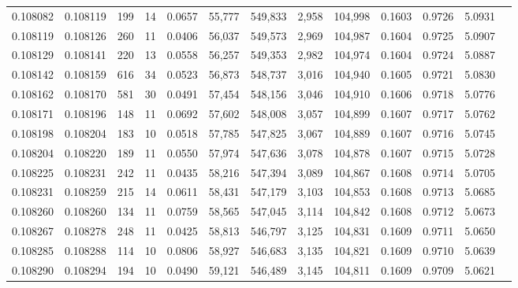 \begin{tabular}{rrrrrrrrrrrrr}
0.108082 & 0.108119 &   199 &  14 &                                     0.0657 &  55,777 & 549,833 &   2,958 & 104,998 & 0.1603 & 0.9726 & 5.0931 \\
0.108119 & 0.108126 &   260 &  11 &                                     0.0406 &  56,037 & 549,573 &   2,969 & 104,987 & 0.1604 & 0.9725 & 5.0907 \\
0.108129 & 0.108141 &   220 &  13 &                                     0.0558 &  56,257 & 549,353 &   2,982 & 104,974 & 0.1604 & 0.9724 & 5.0887 \\
0.108142 & 0.108159 &   616 &  34 &                                     0.0523 &  56,873 & 548,737 &   3,016 & 104,940 & 0.1605 & 0.9721 & 5.0830 \\
0.108162 & 0.108170 &   581 &  30 &                                     0.0491 &  57,454 & 548,156 &   3,046 & 104,910 & 0.1606 & 0.9718 & 5.0776 \\
0.108171 & 0.108196 &   148 &  11 &                                     0.0692 &  57,602 & 548,008 &   3,057 & 104,899 & 0.1607 & 0.9717 & 5.0762 \\
0.108198 & 0.108204 &   183 &  10 &                                     0.0518 &  57,785 & 547,825 &   3,067 & 104,889 & 0.1607 & 0.9716 & 5.0745 \\
0.108204 & 0.108220 &   189 &  11 &                                     0.0550 &  57,974 & 547,636 &   3,078 & 104,878 & 0.1607 & 0.9715 & 5.0728 \\
0.108225 & 0.108231 &   242 &  11 &                                     0.0435 &  58,216 & 547,394 &   3,089 & 104,867 & 0.1608 & 0.9714 & 5.0705 \\
0.108231 & 0.108259 &   215 &  14 &                                     0.0611 &  58,431 & 547,179 &   3,103 & 104,853 & 0.1608 & 0.9713 & 5.0685 \\
0.108260 & 0.108260 &   134 &  11 &                                     0.0759 &  58,565 & 547,045 &   3,114 & 104,842 & 0.1608 & 0.9712 & 5.0673 \\
0.108267 & 0.108278 &   248 &  11 &                                     0.0425 &  58,813 & 546,797 &   3,125 & 104,831 & 0.1609 & 0.9711 & 5.0650 \\
0.108285 & 0.108288 &   114 &  10 &                                     0.0806 &  58,927 & 546,683 &   3,135 & 104,821 & 0.1609 & 0.9710 & 5.0639 \\
0.108290 & 0.108294 &   194 &  10 &                                     0.0490 &  59,121 & 546,489 &   3,145 & 104,811 & 0.1609 & 0.9709 & 5.0621 \\

\end{tabular}
